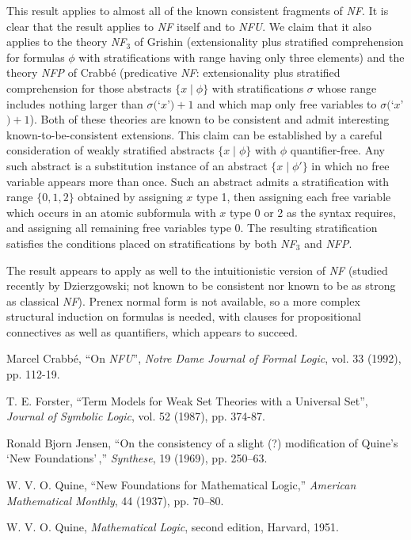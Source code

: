 \documentclass{article}
\begin{document}
This result applies to almost all of the known consistent fragments of
{\em NF\/}.  It is clear that the result applies to {\em NF\/} itself
and to {\em NFU\/}.  We claim that it also applies to the theory {\em
NF$_3$\/} of Grishin (extensionality plus stratified comprehension for
formulas $\phi$ with stratifications with range having only three
elements) and the theory {\em NFP\/} of Crabb\'e (predicative {\em
NF\/}: extensionality plus stratified comprehension for those
abstracts $\{x \mid \phi\}$ with stratifications $\sigma$ whose range
includes nothing larger than $\sigma($`$x$'$)+1$ and which map only
free variables to $\sigma($`$x$'$)+1$).  Both of these theories are
known to be consistent and admit interesting known-to-be-consistent
extensions.  This claim can be established by a careful consideration
of weakly stratified abstracts $\{x \mid
\phi\}$ with $\phi$ quantifier-free.  Any such abstract is a
substitution instance of an abstract $\{x \mid \phi'\}$ in which no
free variable appears more than once.  Such an abstract admits a
stratification with range $\{0,1,2\}$ obtained by assigning $x$ type
1, then assigning each free variable which occurs in an atomic
subformula with $x$ type 0 or 2 as the syntax requires, and assigning
all remaining free variables type 0.  The resulting stratification
satisfies the conditions placed on stratifications by both {\em
NF$_3$\/} and {\em NFP\/}.

The result appears to apply as well to the intuitionistic version of
{\em NF\/} (studied recently by Dzierzgowski; not known to be
consistent nor known to be as strong as classical {\em NF\/}).  Prenex
normal form is not available, so a more complex structural induction on
formulas is needed, with clauses for propositional connectives as
well as quantifiers, which appears to succeed.

\begin{thebibliography}{99}

 Marcel Crabb\'e, ``On {\em NFU\/}'', {\em Notre Dame Journal of Formal Logic\/}, vol. 33 (1992), pp. 112-19.

 T. E. Forster, ``Term Models for Weak Set Theories with
a Universal Set'', {\em Journal of Symbolic Logic\/}, vol. 52 (1987),
pp. 374-87.

  Ronald Bjorn Jensen, ``On the consistency of a slight
(?) modification of Quine's `New Foundations'\,,'' {\em Synthese}, 19
(1969), pp. 250--63.


 W. V. O. Quine, ``New Foundations for Mathematical
 Logic,'' {\em American Mathematical Monthly}, 44 (1937), pp. 70--80.


  W. V. O. Quine, {\em Mathematical Logic\/}, second
edition, Harvard, 1951.


\end{thebibliography}


 
\end{document}
